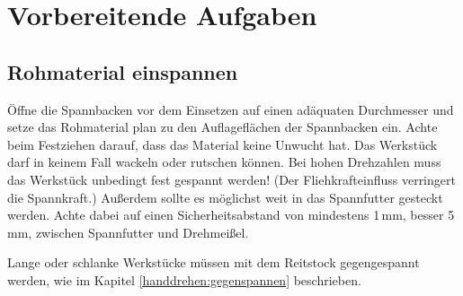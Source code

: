\documentclass{\basedir/fablab-document}
\begin{document}
\begin{figure}[pc]

\vspace{-4cm}
\end{figure}

\newpage
\pagestyle{fancy}



\newpage
\section{Vorbereitende Aufgaben}
\subsection{Rohmaterial einspannen}

Öffne die Spannbacken vor dem Einsetzen auf einen adäquaten Durchmesser und setze das Rohmaterial
plan zu den Auflageflächen der Spannbacken ein.
Achte beim Festziehen darauf, dass das Material keine Unwucht hat.
Das Werkstück darf in keinem Fall wackeln oder rutschen können.
Bei hohen Drehzahlen muss das Werkstück unbedingt fest gespannt werden!
(Der Fliehkrafteinfluss verringert die Spannkraft.)
Außerdem sollte es möglichst weit in das Spannfutter gesteckt werden.
Achte dabei auf einen Sicherheitsabstand von mindestens 1\,mm, besser 5\,mm, zwischen Spannfutter und Drehmeißel.

Lange oder schlanke Werkstücke müssen mit dem Reitstock gegengespannt werden,
wie im Kapitel \ref{handdrehen:gegenspannen} beschrieben.
\end{document}

